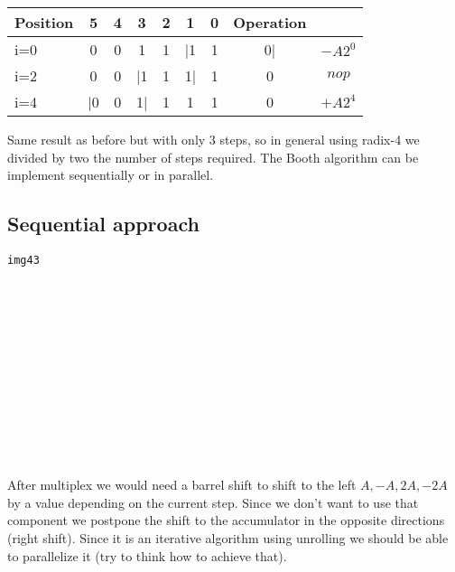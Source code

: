 \begin{center}
\begin{tabular}{|l|c|c|c|c|c|c|c|c|}
  \hline
  Position&   5&  4&  3&  2&  1&  0&   Operation\\
  \hline
  i=0&    0&  0&  1&  1&  |1& 1&  0|&   $-A2^0$\\
  i=2&    0&  0&  |1& 1&  1|& 1&  0&    $nop$\\
  i=4&    |0&  0& 1|& 1&  1&  1&  0&    $+ A 2^4$\\
  \hline
\end{tabular}
\end{center}
Same result as before but with only 3 steps, so in general using radix-4 we divided by two the number of steps required.
The Booth algorithm can be implement sequentially or in parallel.

\subsection{Sequential approach}

\begin{verbatim}
img43














\end{verbatim}

After multiplex we would need a barrel shift to shift to the left $A, -A, 2A, -2A$ by a value depending on the current step. Since we don't want to use that component we postpone the shift to the accumulator in the opposite directions (right shift). Since it is an iterative algorithm using unrolling we should be able to parallelize it (try to think how to achieve that).

